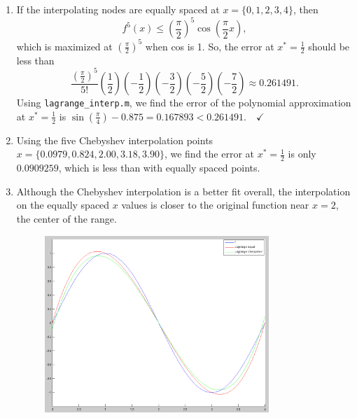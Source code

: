 \documentclass[12pt,letterpaper]{article}
\begin{document}
\begin{enumerate}
\begin{enumerate}
      \item If the interpolating nodes are equally spaced at $x=\{0,1,2,3,4\}$,
        then
        \[f^5(x) \leq \left(\frac\pi2\right)^5\cos\left(\frac\pi2x\right),\]
        which is maximized at $\left(\frac\pi2\right)^5$ when cos is 1. So, the
        error at $x^*=\frac12$ should be less than
        \[\frac{\left(\frac\pi2\right)^5}{5!}
          \left(\frac12\right)
          \left(-\frac12\right)
          \left(-\frac32\right)
          \left(-\frac52\right)
          \left(-\frac72\right)
        \approx 0.261491.\]
        Using {\tt lagrange\_interp.m}, we find the error of the polynomial
        approximation at $x^*=\frac12$ is $\sin\left(\frac\pi4\right)-0.875
        = \boxed{0.167893} < 0.261491. \quad \checkmark$

      \item Using the five Chebyshev interpolation points $x=\{0.0979, 0.824,
        2.00, 3.18, 3.90\}$, we find the error at $x^*=\frac12$ is only
        $0.0909259$, which is less than with equally spaced points.

      \item Although the Chebyshev interpolation is a better fit overall, the
        interpolation on the equally spaced $x$ values is closer to the
        original function near $x=2$, the center of the range.
        \begin{figure}[!h]
          \centering
          \includegraphics[width=0.8\textwidth]{img/2d.png}
        \end{figure}
    \end{enumerate}


\end{enumerate}
\end{document}
